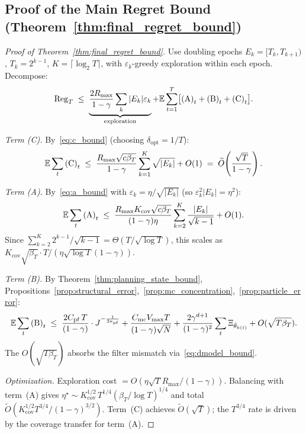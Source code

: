 \subsection{Proof of the Main Regret Bound (Theorem~\ref{thm:final_regret_bound})}
\label{app:regret_proof}

\begin{proof}[Proof of Theorem~\ref{thm:final_regret_bound}]
Use doubling epochs $E_k=[T_k,T_{k+1})$, $T_k=2^{k-1}$, $K=\lceil\log_2 T\rceil$, with $\varepsilon_k$-greedy exploration within each epoch. Decompose:
\[
\mathrm{Reg}_T \;\le\; \underbrace{\frac{2R_{\max}}{1-\gamma}\sum_k|E_k|\varepsilon_k}_{\text{exploration}} + \mathbb{E}\sum_{t=1}^T\bigl[\text{(A)}_t+\text{(B)}_t+\text{(C)}_t\bigr].
\]

\emph{Term (C).} By~\eqref{eq:c_bound} (choosing $\delta_{\mathrm{opt}}=1/T$):
\[
\mathbb{E}\sum_{t}\text{(C)}_t\;\le\; \frac{R_{\max}\sqrt{c\beta_T}}{1-\gamma}\sum_{k=1}^K\sqrt{|E_k|}+O(1)
\;=\;\widetilde O\!\left(\frac{\sqrt{T}}{1-\gamma}\right).
\]

\emph{Term (A).} By~\eqref{eq:a_bound} with $\varepsilon_k=\eta/\sqrt{|E_k|}$ (so $\varepsilon_k^2|E_k|=\eta^2$):
\[
\mathbb{E}\sum_t\text{(A)}_t\;\le\;\frac{R_{\max}K_{\mathrm{cov}}\sqrt{c\beta_T}}{(1-\gamma)\eta}\sum_{k=2}^K\frac{|E_k|}{\sqrt{k-1}}+O(1).
\]
Since $\sum_{k=2}^K 2^{k-1}/\sqrt{k-1}=\Theta(T/\sqrt{\log T})$, this scales as $K_{\mathrm{cov}}\sqrt{\beta_T}\cdot T/(\eta\sqrt{\log T}(1-\gamma))$.

\emph{Term (B).} By Theorem~\ref{thm:planning_state_bound}, Propositions~\ref{prop:structural_error},~\ref{prop:mc_concentration},~\ref{prop:particle_error}:
\[
\mathbb{E}\sum_{t}\text{(B)}_t
\;\le\; \frac{2C_{\mathrm{pf}}\,T}{(1-\gamma)}\cdot J^{-\frac{1}{2\kappa_{\mathrm{pf}}}}
+\frac{C_{\mathrm{mc}}V_{\max}T}{(1-\gamma)\sqrt{N}}
+\frac{2\gamma^{d+1}}{(1-\gamma)^2}\sum_t\Xi_{\bar\theta_{k(t)}}
+O(\sqrt{T\beta_T}).
\]
The $O(\sqrt{T\beta_T})$ absorbs the filter mismatch via~\eqref{eq:dmodel_bound}.

\emph{Optimization.} Exploration cost $=O(\eta\sqrt{T}R_{\max}/(1-\gamma))$. Balancing with term~(A) gives $\eta^\star\sim K_{\mathrm{cov}}^{1/2}\,T^{1/4}(\beta_T/\log T)^{1/4}$ and total $\widetilde O(K_{\mathrm{cov}}^{1/2}T^{3/4}/(1-\gamma)^{3/2})$.
Term~(C) achieves $\widetilde O(\sqrt{T})$; the $T^{3/4}$ rate is driven by the coverage transfer for term~(A).
\end{proof}

 


